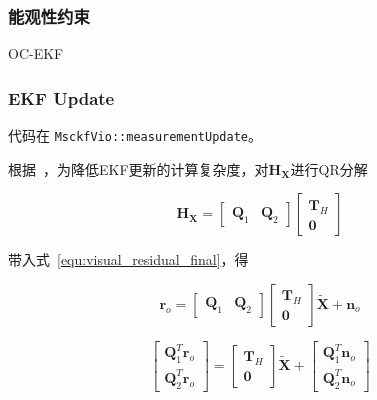 \documentclass[12pt,a4paper]{article}
\begin{document}
\subsubsection{能观性约束}

OC-EKF


\subsubsection{EKF Update}

代码在 \verb|MsckfVio::measurementUpdate|。

根据~\cite{mourikis2007multi}，为降低EKF更新的计算复杂度，对$\mathbf{H}_{\mathbf{X}}$进行QR分解

\begin{equation}
\mathbf{H}_{\mathbf{X}}=\left[\begin{array}{ll}{\mathbf{Q}_{1}} & {\mathbf{Q}_{2}}\end{array}\right]\left[\begin{array}{c}{\mathbf{T}_{H}} \\ {\mathbf{0}}\end{array}\right]
\end{equation}

带入式~\eqref{equ:visual_residual_final}，得

\begin{equation}
\mathbf{r}_{o}=\left[\begin{array}{ll}{\mathbf{Q}_{1}} & {\mathbf{Q}_{2}}\end{array}\right]\left[\begin{array}{c}{\mathbf{T}_{H}} \\ {\mathbf{0}}\end{array}\right] \tilde{\mathbf{X}}+\mathbf{n}_{o}
\end{equation}

\begin{equation}
\left[\begin{array}{l}
{\mathbf{Q}_{1}^{T} \mathbf{r}_{o}} \\ {\mathbf{Q}_{2}^{T} \mathbf{r}_{o}}\end{array}\right]=\left[\begin{array}{c}{\mathbf{T}_{H}} \\ {\mathbf{0}}\end{array}\right] \tilde{\mathbf{X}}+\left[\begin{array}{l}{\mathbf{Q}_{1}^{T} \mathbf{n}_{o}} \\ {\mathbf{Q}_{2}^{T} \mathbf{n}_{o}}\end{array}\right]
\end{equation}
\end{document}
